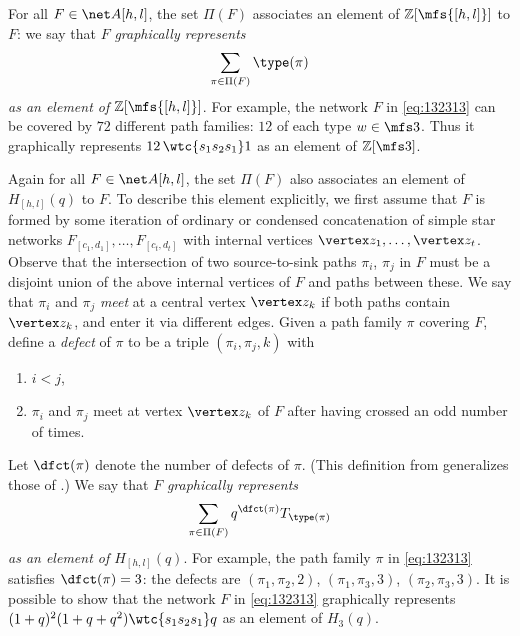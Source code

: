 For all $F \in \net A{[h,l]}$, the set $\Pi(F)$ associates an element of
$\mathbb Z[\mfs{[h,l]}]$ to $F$:
we say that $F$ {\em graphically represents}
\begin{equation}\label{eq:Gtozsn}
\sum_{\pi \in \Pi(F)} \type(\pi)
\end{equation}
{\em as an element of $\mathbb Z[\mfs{[h,l]}]$}.
For example, the network $F$ in \eqref{eq:132313} can be covered by
$72$ different path families: $12$ of each type $w \in \mfs 3$.
Thus it graphically represents
$12\,\wtc{s_1s_2s_1}1$
as an element of $\mathbb Z [\mfs 3]$.

Again for all $F \in \net A{[h,l]}$,
the set $\Pi(F)$ also associates an element of
$H_{[h,l]}(q)$ to $F$.
To describe this element explicitly, we first assume
that $F$ is formed by some iteration of ordinary or condensed concatenation
of simple star networks $F_{[c_1,d_1]}, \dotsc, F_{[c_t,d_t]}$ with
internal vertices $\vertex z_1, \dotsc, \vertex z_t$. Observe that
the intersection of two source-to-sink paths $\pi_i$, $\pi_j$ in $F$
must be a disjoint union of the above internal vertices of $F$
and paths between these.
We say that $\pi_i$ and $\pi_j$ {\em meet} at a central vertex $\vertex z_k$
if both paths contain $\vertex z_k$, and enter it via different edges.
Given a path family $\pi$ covering $F$,
define a {\em defect} of $\pi$ to be a triple $(\pi_i, \pi_j, k)$ with
\begin{enumerate}
  \item $i < j$,
  \item $\pi_i$ and $\pi_j$ meet at vertex $\vertex z_k$ of
    $F$ after having crossed an odd number of times.
\end{enumerate}
Let $\dfct(\pi)$ denote the number of defects of $\pi$.
(This definition from \cite{CSkanTNNChar}
generalizes those of \cite{BWHex, Deodhar90}.)
We say that $F$ {\em graphically represents}
\begin{equation}\label{eq:Gtozhnq}
\sum_{\pi \in \Pi(F)} q^{\dfct(\pi)} T_{\type(\pi)}
\end{equation}
{\em as an element of $H_{[h,l]}(q)$}.
For example,
the path family $\pi$ in \eqref{eq:132313}
satisfies $\dfct(\pi) = 3$: the defects are
$(\pi_1, \pi_2, 2)$, $(\pi_1, \pi_3, 3)$, $(\pi_2, \pi_3, 3)$.
It is possible to show that the network $F$ in \eqref{eq:132313}
graphically represents
$(1+q)^2(1+q+q^2) \wtc{s_1s_2s_1}q$
as an element of $H_3(q)$.


